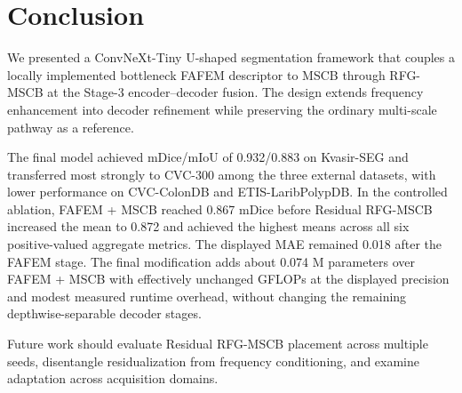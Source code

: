 \section{Conclusion}\label{conclusion}

We presented a ConvNeXt-Tiny U-shaped segmentation framework that couples a locally
implemented bottleneck FAFEM descriptor to MSCB through RFG-MSCB at the Stage-3
encoder--decoder fusion. The design extends frequency enhancement into decoder
refinement while preserving the ordinary multi-scale pathway as a reference.

The final model achieved mDice/mIoU of 0.932/0.883 on Kvasir-SEG and transferred
most strongly to CVC-300 among the three external datasets, with lower performance on
CVC-ColonDB and ETIS-LaribPolypDB. In the controlled ablation, FAFEM + MSCB reached
0.867 mDice before Residual RFG-MSCB increased the mean to 0.872 and achieved the
highest means across all six positive-valued aggregate metrics. The displayed MAE
remained 0.018 after the FAFEM stage. The final modification adds about 0.074 M
parameters over FAFEM + MSCB with effectively unchanged GFLOPs at the displayed
precision and modest measured runtime overhead, without changing the remaining
depthwise-separable decoder stages.

Future work should evaluate Residual RFG-MSCB placement across multiple seeds,
disentangle residualization from frequency conditioning, and examine adaptation across
acquisition domains.
